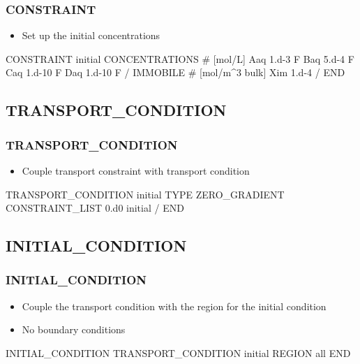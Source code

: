 \documentclass{beamer}
\newcommand\bluecomment[1]{{{\color{blue} #1}}}
\begin{document}
\begin{frame}[fragile]\frametitle{CONSTRAINT}

\begin{itemize}
  \item Set up the initial concentrations
\end{itemize}

\begin{semiverbatim}

CONSTRAINT initial
  CONCENTRATIONS \bluecomment{# [mol/L]}
    Aaq  1.d-3   F
    Baq  5.d-4   F
    Caq  1.d-10  F
    Daq  1.d-10  F
  /
  IMMOBILE     \bluecomment{# [mol/m^3 bulk]}
    Xim  1.d-4
  /
END

\end{semiverbatim}

\end{frame}

\subsection{TRANSPORT\_CONDITION}

\begin{frame}[fragile]\frametitle{TRANSPORT\_CONDITION}


\begin{itemize}
  \item Couple transport constraint with transport condition
\end{itemize}
\begin{semiverbatim}

TRANSPORT_CONDITION initial
  TYPE ZERO_GRADIENT
  CONSTRAINT_LIST
    0.d0 initial
  /
END

\end{semiverbatim}

\end{frame}

\subsection{INITIAL\_CONDITION}

\begin{frame}[fragile]\frametitle{INITIAL\_CONDITION}

\begin{itemize}
\item Couple the transport condition with the region for the initial condition
\item No boundary conditions
\end{itemize}

\begin{semiverbatim}

INITIAL_CONDITION
  TRANSPORT_CONDITION initial
  REGION all
END

\end{semiverbatim}

\end{frame}
\end{document}
